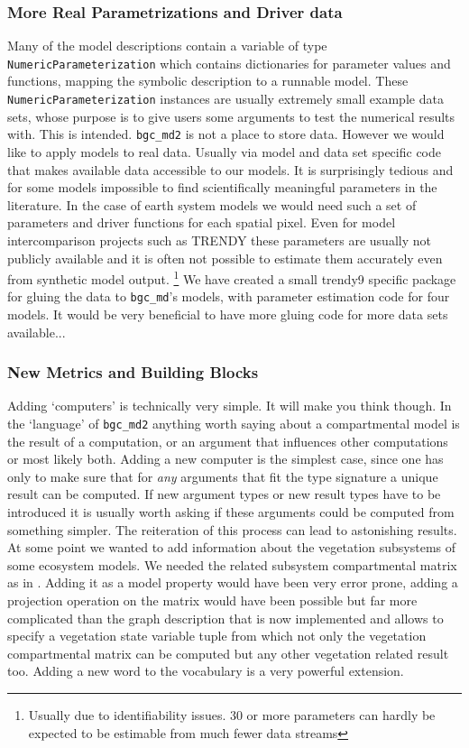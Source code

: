 \subsubsection{More Real Parametrizations and Driver data}
Many of the model descriptions contain a variable of type \texttt{NumericParameterization} 
which contains dictionaries for parameter values and functions, mapping the symbolic description to a runnable model.
These \texttt{NumericParameterization} instances are usually extremely small example data sets, whose purpose is to give users some arguments to test the numerical results with.
This is intended. \texttt{bgc\_md2} is not a place to store data.
However we would like to apply models to real data. Usually via model and data set specific code that makes available data accessible to our models.
It is surprisingly tedious  and for some models impossible to find scientifically meaningful parameters in the literature.
In the case of earth system models we would need such a set of parameters and driver functions for each spatial pixel.
Even for model intercomparison projects such as TRENDY \cite{sitch_recent_2015} these parameters are usually not publicly available and it is 
often not possible to estimate them accurately even from synthetic model output. 
\footnote{
  Usually due to identifiability issues. 
  30 or more parameters can hardly be expected to be estimable from much fewer data streams
}
We have created a small trendy9 specific package for gluing the data to \texttt{bgc\_md}'s models, with parameter estimation code for four models.
It would be very beneficial to have more gluing code for more data sets available...


\subsubsection{New Metrics and Building Blocks}
Adding `computers' is technically very simple. It will make you think though.
In the `language' of \texttt{bgc\_md2} anything worth saying about a compartmental model is the result of a computation, or an argument that influences other computations or most likely both.
Adding a new computer is the simplest case, since one has only to make sure that for \emph{any} arguments that fit the type signature a unique result can be computed. If new argument types or new result types have to be introduced it is usually worth asking if these arguments could be computed from something simpler. The reiteration of this process can lead to astonishing results.
At some point we wanted to add information about the vegetation subsystems of some ecosystem models. 
We needed the related subsystem compartmental matrix as in \cite{Ceballos2018Biogeosciences}. 
Adding it as a model property would have been very error prone, adding a projection operation on the matrix would have been possible but far more complicated
than the graph description that is now implemented and allows to specify a
vegetation state variable tuple from which not only the vegetation
compartmental matrix can be computed but any other vegetation related result too. 
Adding a new word to the vocabulary is a very powerful extension.

